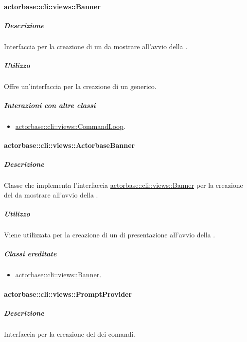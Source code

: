 \documentclass{scalatekids-article}
\begin{document}
\paragraph{actorbase::cli::views::Banner}
\label{sec:actorbase::cli::views::Banner}

\subparagraph{Descrizione}

Interfaccia per la creazione di un  da mostrare all'avvio della
.

\subparagraph{Utilizzo}

Offre un'interfaccia per la creazione di un  generico.

\subparagraph{Interazioni con altre classi}

\begin{itemize}
\item \hyperref[sec:actorbase::cli::views::CommandLoop]{actorbase::cli::views::CommandLoop}.
\end{itemize}

\paragraph{actorbase::cli::views::ActorbaseBanner}
\label{sec:actorbase::cli::views::ActorbaseBanner}

\subparagraph{Descrizione}

Classe che implementa l'interfaccia \hyperref[sec:actorbase::cli::views::Banner]{actorbase::cli::views::Banner} per la
creazione del  da mostrare all'avvio della .

\subparagraph{Utilizzo}

Viene utilizzata per la creazione di un  di presentazione
all'avvio della .

\subparagraph{Classi ereditate}

\begin{itemize}
\item \hyperref[sec:actorbase::cli::views::Banner]{actorbase::cli::views::Banner}.
\end{itemize}

\paragraph{actorbase::cli::views::PromptProvider}
\label{sec:actorbase::cli::views::PromptProvider}

\subparagraph{Descrizione}

Interfaccia per la creazione del  dei comandi.
\end{document}
